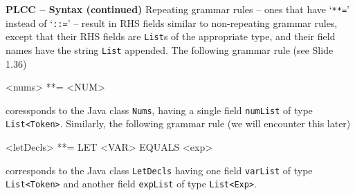 \begin{minipage}[t]{\sw}
\slidenumber
\LARGE
{\bf PLCC -- Syntax (continued)}\exx
Repeating grammar rules --
ones that have `\verb'**='' instead of `\verb'::='' --
result in RHS fields similar
to non-repeating grammar rules,
except that their RHS fields are \verb'List's of the appropriate type,
and their field names have the string \verb'List' appended.\exx
The following grammar rule (see Slide 1.36)
{\Large
\begin{qv}
<nums> **= <NUM>
\end{qv}
}
coressponds to the Java class \verb'Nums',
having a single field \verb'numList' of type \verb'List<Token>'.\exx
Similarly, the following grammar rule (we will encounter this later)
{\Large
\begin{qv}
<letDecls> **= LET <VAR> EQUALS <exp>
\end{qv}
}
corresponds to the Java class \verb'LetDecls'
having one field \verb'varList' of type \verb'List<Token>'
and another field \verb'expList' of type \verb'List<Exp>'.
\end{minipage}
\clearpage
